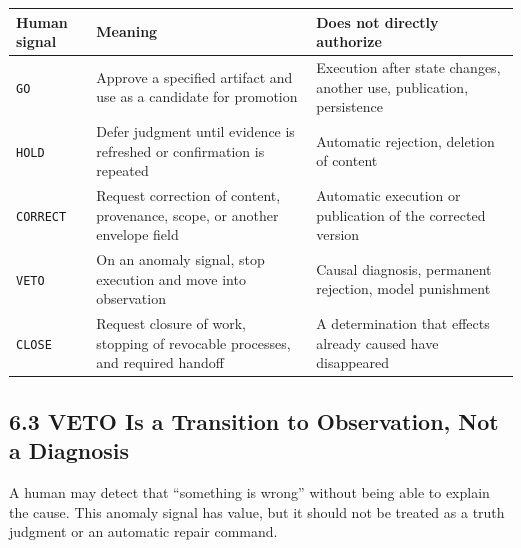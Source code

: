 {\def\LTcaptype{none} %
\begin{longtable}[]{@{}
  >{\raggedright\arraybackslash}p{}
  >{\raggedright\arraybackslash}p{}
  >{\raggedright\arraybackslash}p{}@{}}
\toprule\noalign{}
\begin{minipage}[b]{\linewidth}\raggedright
Human signal
\end{minipage} & \begin{minipage}[b]{\linewidth}\raggedright
Meaning
\end{minipage} & \begin{minipage}[b]{\linewidth}\raggedright
Does not directly authorize
\end{minipage} \\
\midrule\noalign{}
\endhead
\bottomrule\noalign{}
\endlastfoot
\passthrough{\lstinline!GO!} & Approve a specified artifact and use as a candidate for promotion & Execution after state changes, another use, publication, persistence \\
\passthrough{\lstinline!HOLD!} & Defer judgment until evidence is refreshed or confirmation is repeated & Automatic rejection, deletion of content \\
\passthrough{\lstinline!CORRECT!} & Request correction of content, provenance, scope, or another envelope field & Automatic execution or publication of the corrected version \\
\passthrough{\lstinline!VETO!} & On an anomaly signal, stop execution and move into observation & Causal diagnosis, permanent rejection, model punishment \\
\passthrough{\lstinline!CLOSE!} & Request closure of work, stopping of revocable processes, and required handoff & A determination that effects already caused have disappeared \\
\end{longtable}
}

\subsection{6.3 VETO Is a Transition to Observation, Not a Diagnosis}\label{veto-is-a-transition-to-observation-not-a-diagnosis}

A human may detect that ``something is wrong'' without being able to explain the cause. This anomaly signal has value, but it should not be treated as a truth judgment or an automatic repair command.

